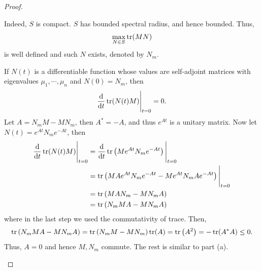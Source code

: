 \documentclass[10pt]{book}
\theoremstyle{definition}
\numberwithin{equation}{chapter}
\begin{document}
\begin{proof}
\begin{enumerate}[label=(\alph*)]
    Indeed, $S$ is compact. $S$ has bounded spectral radius, and hence bounded. Thus, 
    $$\max_{N \in S} \tr (MN)$$ 
    is well defined and such $N$ exists, denoted by $N_m$. 
    
    If $N(t)$ is a differentiable function whose values are self-adjoint matrices with eigenvalues $\mu_1, \cdots, \mu_n$ and $N(0) = N_m$, then 
    \begin{align*}
        \dv{}{t} \tr (N(t)M)\Bigg|_{t=0} = 0.
    \end{align*}
    Let $A = N_m M - M N_m$, then $A^* = - A$, and thus $e^{At}$ is a unitary matrix. Now let $N(t) = e^{At} N_m e^{-At}$, then
    \begin{align*}
        \dv{}{t} \tr (N(t)M)\Bigg|_{t=0} & = \dv{}{t} \tr \left(M e^{At} N_m e^{-At} \right)\Bigg|_{t=0} \\
        & = \tr \left(M A e^{At} N_m e^{-At} - M e^{At} N_m A e^{-At} \right)\Bigg|_{t=0} \\
        & = \tr \left(M A N_m - M N_m A \right) \\
        & = \tr \left(N_m M A - M N_m A \right)
    \end{align*}
    where in the last step we used the commutativity of trace. Then, 
    \begin{align*}
        \tr \left(N_m M A - M N_m A \right) = \tr \left(N_m M - M N_m \right) \tr (A) = \tr \left(A^2 \right) = - \tr (A^*A) \leq 0.
    \end{align*}
    Thus, $A = 0$ and hence $M, N_m$ commute. The rest is similar to part (a).
\end{enumerate}
\end{proof}

\medskip
\end{document}
